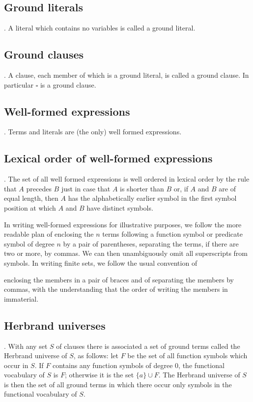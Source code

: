 \documentclass[8pt]{extarticle}
\begin{document}
\subsection{Ground literals}. A literal which contains no variables is called a ground literal.

\subsection{Ground clauses}. A clause, each member of which is a ground literal, is called a ground clause. In particular $\square$ is a ground clause.

\subsection{Well-formed expressions}. Terms and literals are (the only) well formed expressions.

\subsection{Lexical order of well-formed expressions}. The set of all well formed expressions is well ordered in lexical order by the rule that $A$ precedes $B$ just in case that $A$ is shorter than $B$ or, if $A$ and $B$ are of equal length, then $A$ has the alphabetically earlier symbol in the first symbol position at which $A$ and $B$ have distinct symbols.

In writing well-formed expressions for illustrative purposes, we follow the more readable plan of enclosing the $n$ terms following a function symbol or predicate symbol of degree $n$ by a pair of parentheses, separating the terms, if there are two or more, by commas. We can then unambiguously omit all superscripts from symbols. In writing finite sets, we follow the usual convention of

\noindent enclosing the members in a pair of braces and of separating the members by commas, with the understanding that the order of writing the members in immaterial.

\subsection{Herbrand universes}. With any set $S$ of clauses there is associated a set of ground terms called the Herbrand universe of $S$, as follows: let $F$ be the set of all function symbols which occur in $S$. If $F$ contains any function symbols of degree 0, the functional vocabulary of $S$ is $F$; otherwise it is the set $\{a\}\cup F$. The Herbrand universe of $S$ is then the set of all ground terms in which there occur only symbols in the functional vocabulary of $S$.
\end{document}
